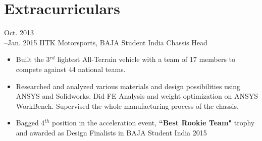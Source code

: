 \section{Extracurriculars}

\cventry
	{Oct. 2013\\--Jan. 2015}
	{IITK Motorsports, BAJA Student India}
	{Chassis Head}
	{}{}
	{
		\begin{itemize}
			\item {Built the 3$^{rd}$ lightest All-Terrain vehicle with a team of 17 members to compete against 44 national teams.}
			\item {Researched and analyzed various materials and design possibilities using ANSYS and Solidworks. Did FE Analysis and weight optimization on ANSYS WorkBench. Supervised the whole manufacturing process of the chassis.}
			\item { Bagged 4$^{th}$ position in the acceleration event, \textbf{``Best Rookie Team"} trophy and awarded as Design Finalists in BAJA Student India 2015 }
		\end{itemize}
	}